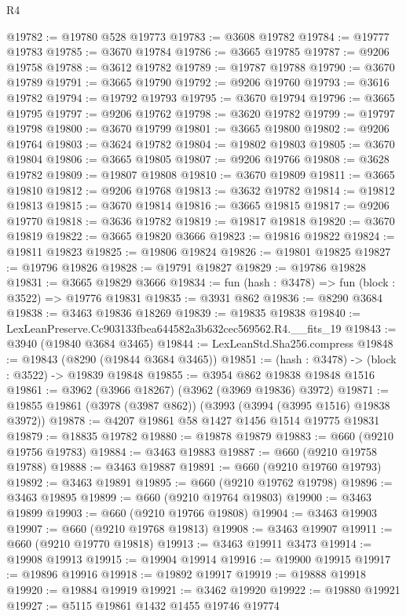 \begin{lexlean}{R4}
\begin{coremodule}
@19782 := @19780 @528 @19773
@19783 := @3608 @19782
@19784 := @19777 @19783
@19785 := @3670 @19784
@19786 := @3665 @19785
@19787 := @9206 @19758
@19788 := @3612 @19782
@19789 := @19787 @19788
@19790 := @3670 @19789
@19791 := @3665 @19790
@19792 := @9206 @19760
@19793 := @3616 @19782
@19794 := @19792 @19793
@19795 := @3670 @19794
@19796 := @3665 @19795
@19797 := @9206 @19762
@19798 := @3620 @19782
@19799 := @19797 @19798
@19800 := @3670 @19799
@19801 := @3665 @19800
@19802 := @9206 @19764
@19803 := @3624 @19782
@19804 := @19802 @19803
@19805 := @3670 @19804
@19806 := @3665 @19805
@19807 := @9206 @19766
@19808 := @3628 @19782
@19809 := @19807 @19808
@19810 := @3670 @19809
@19811 := @3665 @19810
@19812 := @9206 @19768
@19813 := @3632 @19782
@19814 := @19812 @19813
@19815 := @3670 @19814
@19816 := @3665 @19815
@19817 := @9206 @19770
@19818 := @3636 @19782
@19819 := @19817 @19818
@19820 := @3670 @19819
@19822 := @3665 @19820 @3666
@19823 := @19816 @19822
@19824 := @19811 @19823
@19825 := @19806 @19824
@19826 := @19801 @19825
@19827 := @19796 @19826
@19828 := @19791 @19827
@19829 := @19786 @19828
@19831 := @3665 @19829 @3666
@19834 := fun (hash : @3478) => fun (block : @3522) => @19776 @19831
@19835 := @3931 @862
@19836 := @8290 @3684
@19838 := @3463 @19836 @18269
@19839 := @19835 @19838
@19840 := LexLeanPreserve.Cc903133fbea644582a3b632cec569562.R4.__fits_19
@19843 := @3940 (@19840 @3684 @3465)
@19844 := LexLeanStd.Sha256.compress
@19848 := @19843 (@8290 (@19844 @3684 @3465))
@19851 := (hash : @3478) -> (block : @3522) -> @19839 @19848
@19855 := @3954 @862 @19838 @19848 @1516
@19861 := @3962 (@3966 @18267) (@3962 (@3969 @19836) @3972)
@19871 := @19855 @19861 (@3978 (@3987 @862)) (@3993 (@3994 (@3995 @1516) @19838 @3972))
@19878 := @4207 @19861 @58 @1427 @1456 @1514 @19775 @19831
@19879 := @18835 @19782
@19880 := @19878 @19879
@19883 := @660 (@9210 @19756 @19783)
@19884 := @3463 @19883
@19887 := @660 (@9210 @19758 @19788)
@19888 := @3463 @19887
@19891 := @660 (@9210 @19760 @19793)
@19892 := @3463 @19891
@19895 := @660 (@9210 @19762 @19798)
@19896 := @3463 @19895
@19899 := @660 (@9210 @19764 @19803)
@19900 := @3463 @19899
@19903 := @660 (@9210 @19766 @19808)
@19904 := @3463 @19903
@19907 := @660 (@9210 @19768 @19813)
@19908 := @3463 @19907
@19911 := @660 (@9210 @19770 @19818)
@19913 := @3463 @19911 @3473
@19914 := @19908 @19913
@19915 := @19904 @19914
@19916 := @19900 @19915
@19917 := @19896 @19916
@19918 := @19892 @19917
@19919 := @19888 @19918
@19920 := @19884 @19919
@19921 := @3462 @19920
@19922 := @19880 @19921
@19927 := @5115 @19861 @1432 @1455 @19746 @19774

\end{coremodule}
\end{lexlean}
